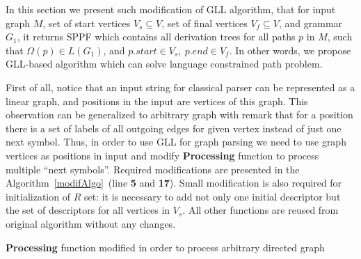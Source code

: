 In this section we present such modification of GLL algorithm, that for input graph $M$, set of start vertices $V_s\subseteq V$, set of final vertices $V_f\subseteq V$, and grammar $G_1$, it returns SPPF which contains all derivation trees for all paths $p$ in $M$, such that $\Omega(p) \in L(G_1)$, and $p.start \in V_s,\ p.end \in V_f$.
In other words, we propose GLL-based algorithm which can solve language constrained path problem.

First of all, notice that an input string for classical parser can be represented as a linear graph, and positions in the input are vertices of this graph.
This observation can be generalized to arbitrary graph with remark that for a position there is a set of labels of all outgoing edges for given vertex instead of just one next symbol. 
Thus, in order to use GLL for graph parsing we need to use graph vertices as positions in input and modify \textbf{Processing} function to process multiple ``next symbols''.
Required modifications are presented in the Algorithm~\ref{modifAlgo}~(line \textbf{5} and \textbf{17}).
Small modification is also required for initialization of $R$ set: it is necessary to add not only one initial descriptor but the set of descriptors for all vertices in $V_s$.
All other functions are reused from original algorithm without any changes.

\begin{algorithm}[h]
\begin{algorithmic}[1]
\caption{\textbf{Processing} function modified in order to process arbitrary directed graph}
\label{modifAlgo}
       \boldnext
       \Else 
       \EndIf
       \EndIf
       \EndFor
  \EndCase
       \boldnext
       \EndFor
  \EndCase
  \EndCase
  \Case{$\_$}
  \EndCase
  \EndSwitch
\EndFunction

\end{algorithmic}
\end{algorithm}

